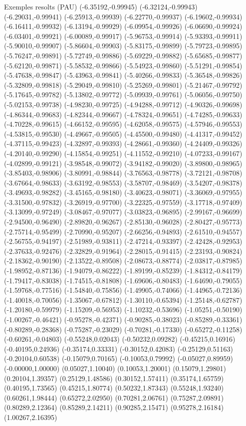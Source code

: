 \documentclass[11pt,a4paper]{article}
\begin{document}
\begin{fmex}{Exemples resolts (PAU)}
(-6.35192,-0.99945) (-6.32124,-0.99943) (-6.29031,-0.99941) (-6.25913,-0.99939) (-6.22770,-0.99937) (-6.19602,-0.99934) (-6.16411,-0.99932) (-6.13194,-0.99929) (-6.09954,-0.99926) (-6.06690,-0.99924) (-6.03401,-0.99921) (-6.00089,-0.99917) (-5.96753,-0.99914) (-5.93393,-0.99911) (-5.90010,-0.99907) (-5.86604,-0.99903) (-5.83175,-0.99899) (-5.79723,-0.99895) (-5.76247,-0.99891) (-5.72749,-0.99886) (-5.69229,-0.99882) (-5.65685,-0.99877) (-5.62120,-0.99871) (-5.58532,-0.99866) (-5.54923,-0.99860) (-5.51291,-0.99854) (-5.47638,-0.99847) (-5.43963,-0.99841) (-5.40266,-0.99833) (-5.36548,-0.99826) (-5.32809,-0.99818) (-5.29049,-0.99810) (-5.25269,-0.99801) (-5.21467,-0.99792) (-5.17645,-0.99782) (-5.13802,-0.99772) (-5.09939,-0.99761) (-5.06056,-0.99750) (-5.02153,-0.99738) (-4.98230,-0.99725) (-4.94288,-0.99712) (-4.90326,-0.99698) (-4.86344,-0.99683) (-4.82344,-0.99667) (-4.78324,-0.99651) (-4.74285,-0.99633) (-4.70228,-0.99615) (-4.66152,-0.99595) (-4.62058,-0.99575) (-4.57946,-0.99553) (-4.53815,-0.99530) (-4.49667,-0.99505) (-4.45500,-0.99480) (-4.41317,-0.99452) (-4.37115,-0.99423) (-4.32897,-0.99393) (-4.28661,-0.99360) (-4.24409,-0.99326) (-4.20140,-0.99290) (-4.15854,-0.99251) (-4.11552,-0.99210) (-4.07233,-0.99167) (-4.02899,-0.99121) (-3.98548,-0.99072) (-3.94182,-0.99020) (-3.89800,-0.98965) (-3.85403,-0.98906) (-3.80991,-0.98844) (-3.76563,-0.98778) (-3.72121,-0.98708) (-3.67664,-0.98633) (-3.63192,-0.98553) (-3.58707,-0.98469) (-3.54207,-0.98378) (-3.49693,-0.98282) (-3.45165,-0.98180) (-3.40623,-0.98071) (-3.36069,-0.97955) (-3.31500,-0.97832) (-3.26919,-0.97700) (-3.22325,-0.97559) (-3.17718,-0.97409) (-3.13099,-0.97249) (-3.08467,-0.97077) (-3.03823,-0.96895) (-2.99167,-0.96699) (-2.94500,-0.96490) (-2.89820,-0.96267) (-2.85130,-0.96028) (-2.80427,-0.95773) (-2.75714,-0.95499) (-2.70990,-0.95207) (-2.66256,-0.94893) (-2.61510,-0.94557) (-2.56755,-0.94197) (-2.51989,-0.93811) (-2.47214,-0.93397) (-2.42428,-0.92953) (-2.37633,-0.92476) (-2.32829,-0.91964) (-2.28015,-0.91415) (-2.23193,-0.90824) (-2.18362,-0.90190) (-2.13522,-0.89508) (-2.08673,-0.88774) (-2.03817,-0.87985) (-1.98952,-0.87136) (-1.94079,-0.86222) (-1.89199,-0.85239) (-1.84312,-0.84179) (-1.79417,-0.83038) (-1.74515,-0.81808) (-1.69606,-0.80483) (-1.64690,-0.79055) (-1.59768,-0.77516) (-1.54840,-0.75856) (-1.49905,-0.74066) (-1.44965,-0.72136) (-1.40018,-0.70056) (-1.35067,-0.67812) (-1.30110,-0.65394) (-1.25148,-0.62787) (-1.20180,-0.59979) (-1.15209,-0.56953) (-1.10232,-0.53696) (-1.05251,-0.50190) (-1.00267,-0.46421) (-0.95278,-0.42371) (-0.90285,-0.38023) (-0.85289,-0.33361) (-0.80289,-0.28368) (-0.75287,-0.23029) (-0.70281,-0.17330) (-0.65272,-0.11258) (-0.60261,-0.04803) (-0.55248,0.02043) (-0.50232,0.09282) (-0.45215,0.16916) (-0.40195,0.24936) (-0.35174,0.33331) (-0.30152,0.42083) (-0.25129,0.51163) (-0.20104,0.60538) (-0.15079,0.70165) (-0.10053,0.79992) (-0.05027,0.89959) (-0.00000,1.00000) (0.05027,1.10040) (0.10053,1.20001) (0.15079,1.29801) (0.20104,1.39357) (0.25129,1.48586) (0.30152,1.57411) (0.35174,1.65759) (0.40195,1.73565) (0.45215,1.80774) (0.50232,1.87343) (0.55248,1.93240) (0.60261,1.98444) (0.65272,2.02950) (0.70281,2.06761) (0.75287,2.09891) (0.80289,2.12364) (0.85289,2.14211) (0.90285,2.15471) (0.95278,2.16184) (1.00267,2.16395) 
\end{fmex}
\end{document}
